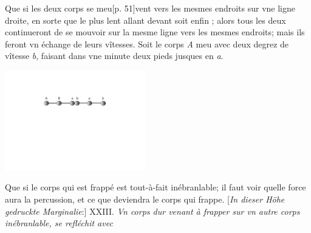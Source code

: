 \pend 
\count{}
\pstart  
[p. 50] Que si les deux corps se meu[p. 51]vent
vers les mesmes endroits sur vne ligne droite, en sorte que le plus lent allant devant soit enfin ; alors tous les deux continueront de se mouvoir sur la mesme ligne vers les mesmes endroits; mais ils feront vn \'{e}change de leurs v\^{i}tesses. Soit le corps \textit{A} meu avec deux degrez de v\^{i}tesse \textit{b}, faisant dans vne minute deux pieds jusques en \textit{a}.
\pend 
\vspace{1em}
\begin{center}
 \noindent \includegraphics[trim = 0mm -3mm 0mm 0mm, clip, width=0.46\textwidth]{images/pardies1670-d3.pdf}\\
              \noindent {} 
\end{center}
\pstart  
[p. 53] Que si le corps qui est frapp\'{e} est tout-\`{a}-fait in\'{e}branlable; il faut voir quelle force aura la percussion, et ce que deviendra le corps qui frappe. [\textit{In dieser H\"{o}he gedruckte Marginalie}:] XXIII. \textit{Vn corps dur venant \`{a} frapper sur vn autre corps in\'{e}branlable, se refl\'{e}chit avec} 
\pend
\count{}
\pstart  
